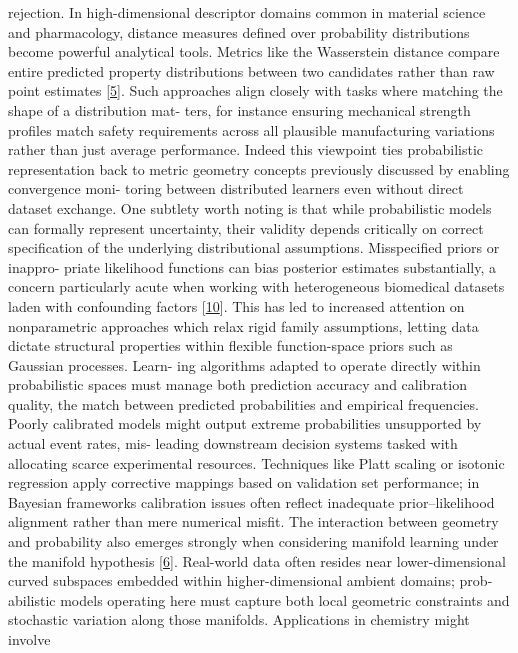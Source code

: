 \documentclass[
]{article}
\begin{document}
rejection. In high-dimensional descriptor domains common in material
science and pharmacology, distance measures defined over probability
distributions become powerful analytical tools. Metrics like the
Wasserstein distance compare entire predicted property distributions
between two candidates rather than raw point estimates
{[}\protect\hyperlink{_bookmark45}{5}{]}. Such approaches align closely
with tasks where matching the shape of a distribution mat- ters, for
instance ensuring mechanical strength profiles match safety requirements
across all plausible manufacturing variations rather than just average
performance. Indeed this viewpoint ties probabilistic representation
back to metric geometry concepts previously discussed by enabling
convergence moni- toring between distributed learners even without
direct dataset exchange. One subtlety worth noting is that while
probabilistic models can formally represent uncertainty, their validity
depends critically on correct specification of the underlying
distributional assumptions. Misspecified priors or inappro- priate
likelihood functions can bias posterior estimates substantially, a
concern particularly acute when working with heterogeneous biomedical
datasets laden with confounding factors
{[}\protect\hyperlink{_bookmark50}{10}{]}. This has led to increased
attention on nonparametric approaches which relax rigid family
assumptions, letting data dictate structural properties within flexible
function-space priors such as Gaussian processes. Learn- ing algorithms
adapted to operate directly within probabilistic spaces must manage both
prediction accuracy and calibration quality, the match between predicted
probabilities and empirical frequencies. Poorly calibrated models might
output extreme probabilities unsupported by actual event rates, mis-
leading downstream decision systems tasked with allocating scarce
experimental resources. Techniques like Platt scaling or isotonic
regression apply corrective mappings based on validation set
performance; in Bayesian frameworks calibration issues often reflect
inadequate prior--likelihood alignment rather than mere numerical
misfit. The interaction between geometry and probability also emerges
strongly when considering manifold learning under the manifold
hypothesis {[}\protect\hyperlink{_bookmark46}{6}{]}. Real-world data
often resides near lower-dimensional curved subspaces embedded within
higher-dimensional ambient domains; prob- abilistic models operating
here must capture both local geometric constraints and stochastic
variation along those manifolds. Applications in chemistry might involve
\end{document}
